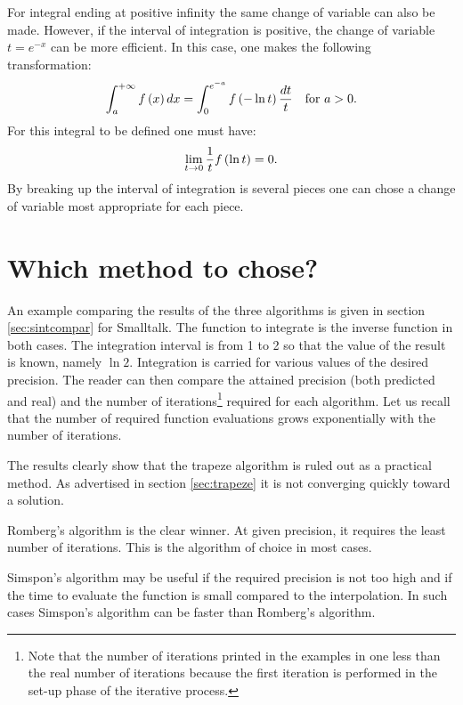 \documentclass[twoside]{book}
\begin{document}
For integral ending at positive infinity the same change of
variable can also be made. However, if the interval of integration
is positive, the change of variable $t=e^{-x}$ can be more
efficient. In this case, one makes the following transformation:
\begin{equation}
\int_a^{+\infty} f\left(x\right)dx=\int_0^{e^{-a}}f\left(-\ln t
\right){dt \over t}\mbox{\quad for $a>0$}.
\end{equation}
For this integral to be defined one must have:
\begin{equation}
  \lim_{t \to 0}{1\over t}f\left(\ln
  t\right)=0.
\end{equation}
By breaking up the interval of integration is several pieces one
can chose a change of variable most appropriate for each piece.

\section{Which method to chose?}
\label{sec:intwhich} An example comparing the results of the three
algorithms is given in section \ref{sec:sintcompar} for Smalltalk.
The function to integrate is the inverse function in both cases. The integration
interval is from 1 to 2 so that the value of the result is known,
namely $\ln 2$. Integration is carried for various values of the
desired precision. The reader can then compare the attained
precision (both predicted and real) and the number of
iterations\footnote{Note that the number of iterations printed in
the examples in one less than the real number of iterations
because the first iteration is performed in the set-up phase of
the iterative process.} required for each algorithm. Let us recall
that the number of required function evaluations grows
exponentially with the number of iterations.

The results clearly show that the trapeze algorithm is ruled out
as a practical method. As advertised in section \ref{sec:trapeze}
it is not converging quickly toward a solution.

Romberg's algorithm is the clear winner. At given precision, it
requires the least number of iterations. This is the algorithm of
choice in most cases.

Simspon's algorithm may be useful if the required precision is not
too high and if the time to evaluate the function is small
compared to the interpolation. In such cases Simspon's algorithm
can be faster than Romberg's algorithm.
\end{document}
